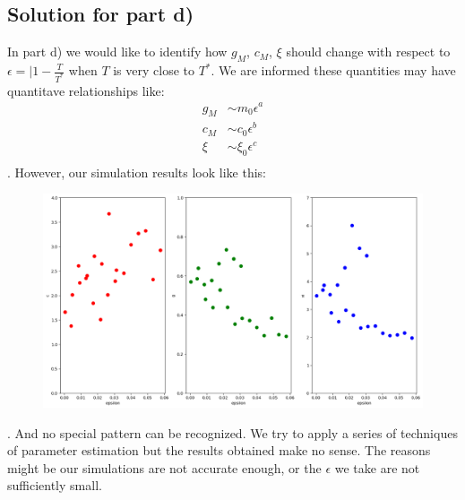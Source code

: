 \documentclass[a4paper]{article}
\begin{document}
\subsection{Solution for part d)}
In part d) we would like to identify how $g_M$, $c_M$, $\xi$ should change with respect to $\epsilon=|1-\frac{T}{T^*}$ when $T$ is very close to $T^*$. We are informed these quantities may have quantitave relationships like:
\begin{displaymath}
\begin{aligned}
g_M &\sim m_0 \epsilon^a\\
c_M &\sim c_0 \epsilon^b\\
\xi &\sim \xi_0 \epsilon^c\\
\end{aligned}
\end{displaymath}
. However, our simulation results look like this:
\begin{figure}[H]
\centering
\includegraphics[scale=0.325]{eps.png}
\end{figure}
. And no special pattern can be recognized. We try to apply a series of techniques of parameter estimation but the results obtained make no sense. The reasons might be our simulations are not accurate enough, or the $\epsilon$ we take are not sufficiently small. 
\end{document}
